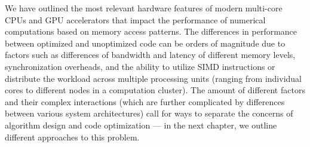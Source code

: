 We have outlined the most relevant hardware features of modern multi-core CPUs and GPU accelerators that impact the performance of numerical computations based on memory access patterns. The differences in performance between optimized and unoptimized code can be orders of magnitude due to factors such as differences of bandwidth and latency of different memory levels, synchronization overheads, and the ability to utilize SIMD instructions or distribute the workload across multiple processing units (ranging from individual cores to different nodes in a computation cluster).
The amount of different factors and their complex interactions (which are further complicated by differences between various system architectures) call for ways to separate the concerns of algorithm design and code optimization --- in the next chapter, we outline different approaches to this problem.








